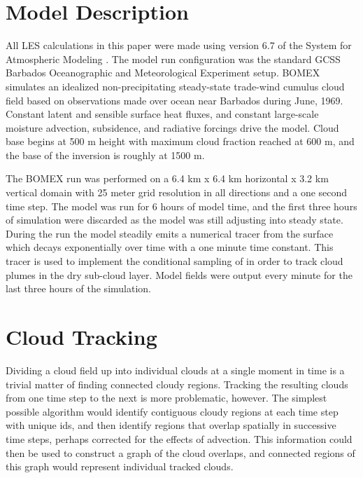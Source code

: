 \documentclass[acp]{copernicus}
\begin{document}

\section{Model Description}

All LES calculations in this paper were made using version 6.7 of the System 
for Atmospheric Modeling \citep[SAM;][]{Khairoutdinov2003}.  The model run 
configuration was the standard GCSS Barbados Oceanographic and Meteorological 
Experiment \citep[BOMEX;][]{Holland1973, Siebesma2003} setup.  BOMEX simulates 
an idealized non-precipitating steady-state trade-wind cumulus cloud field 
based on observations made over ocean near Barbados during June, 1969.  
Constant latent and sensible surface heat fluxes, and constant large-scale 
moisture advection, subsidence, and radiative forcings drive the model.  Cloud 
base begins at 500 m height with maximum cloud fraction reached at 600 m, and 
the base of the inversion is roughly at 1500 m.

The BOMEX run was performed on a 6.4 km x 6.4 km horizontal x 3.2 km vertical 
domain with 25 meter grid resolution in all directions and a one second time 
step.  The model was run for 6 hours of model time, and the first three hours 
of simulation were discarded as the model was still adjusting into steady 
state. During the run the model steadily emits a numerical tracer from the 
surface which decays exponentially over time with a one minute time constant.  
This tracer is used to implement the conditional sampling of 
\cite{Couvreux2010} in order to track cloud plumes in the dry sub-cloud 
layer.  Model fields were output every minute for the last three hours of the 
simulation.


\section{Cloud Tracking}

Dividing a cloud field up into individual clouds at a single moment in time is 
a trivial matter of finding connected cloudy regions.  Tracking the resulting 
clouds from one time step to the next is more problematic, however.  The 
simplest possible algorithm would identify contiguous cloudy regions at each 
time step with unique ids, and then identify regions that overlap spatially in 
successive time steps, perhaps corrected for the effects of advection. This 
information could then be used to construct a graph of the cloud overlaps, and 
connected regions of this graph would represent individual tracked clouds.
\end{document}
